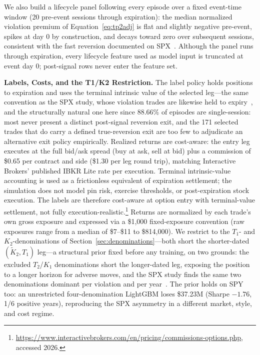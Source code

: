 \documentclass[sigconf,review,anonymous]{acmart}
\begin{document}
We also build a lifecycle panel following every episode over a fixed event-time window (20 pre-event sessions through expiration): the median normalized violation premium of Equation~\eqref{eq:tp2adj} is flat and slightly negative pre-event, spikes at day 0 by construction, and decays toward zero over subsequent sessions, consistent with the fast reversion documented on SPX~\cite{glasserman2025tp2}. Although the panel runs through expiration, every lifecycle feature used as model input is truncated at event day 0; post-signal rows never enter the feature set.

\medskip\noindent\textbf{Labels, Costs, and the T1/K2 Restriction.}
\label{sec:labels}
The label policy holds positions to expiration and uses the terminal intrinsic value of the selected leg---the same convention as the SPX study, whose violation trades are likewise held to expiry~\cite{glasserman2025tp2}, and the structurally natural one here since 88.66\% of episodes are single-session: most never present a distinct post-signal reversion exit, and the 171 selected trades that do carry a defined true-reversion exit are too few to adjudicate an alternative exit policy empirically.
Realized returns are cost-aware: the entry leg executes at the full bid/ask spread (buy at ask, sell at bid) plus a commission of \$0.65 per contract and side (\$1.30 per leg round trip), matching Interactive Brokers' published IBKR Lite rate per execution. Terminal intrinsic-value accounting is used as a frictionless equivalent of expiration settlement; the simulation does not model pin risk, exercise thresholds, or post-expiration stock execution. The labels are therefore cost-aware at option entry with terminal-value settlement, not fully execution-realistic.\footnote{\url{https://www.interactivebrokers.com/en/pricing/commissions-options.php}, accessed 2026.} Returns are normalized by each trade's own gross exposure and expressed via a \$1{,}000 fixed-exposure convention (raw exposures range from a median of \$7--\$11 to \$814{,}000). We restrict to the $T_1$- and $K_2$-denominations of Section~\ref{sec:denominations}---both short the shorter-dated $(\tilde K_2,T_1)$ leg---a structural prior fixed before any training, on two grounds: the excluded $T_2$/$K_1$ denominations short the longer-dated leg, exposing the position to a longer horizon for adverse moves, and the SPX study finds the same two denominations dominant per violation and per year~\cite{glasserman2025tp2}. The prior holds on SPY too: an unrestricted four-denomination LightGBM loses \$37.23M (Sharpe $-1.76$, 1/6 positive years), reproducing the SPX asymmetry in a different market, style, and cost regime.
\end{document}
